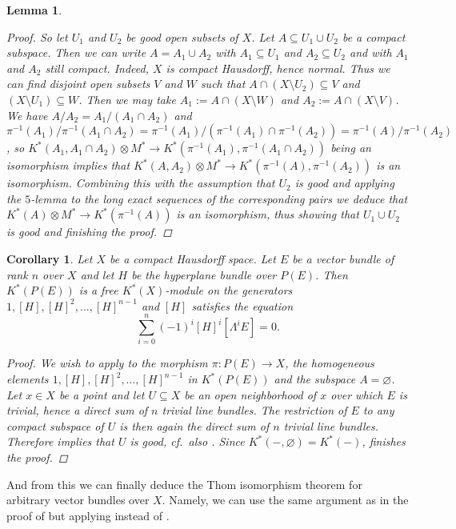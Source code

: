 \documentclass[12pt,a4paper]{amsart}
\theoremstyle{plain}
\newtheorem{lm}[thm]{Lemma}
\newtheorem{cor}[thm]{Corollary}
\theoremstyle{definition}
\theoremstyle{remark}
\begin{document}
\begin{lm}
\begin{proof}
    So let $U_{1}$ and $U_{2}$ be good open subsets of $X$.
    Let $A \subseteq U_{1} \cup U_{2}$ be a compact subspace.
    Then we can write $A = A_{1} \cup A_{2}$ with $A_{1} \subseteq U_{1}$ and $A_{2} \subseteq U_{2}$ and with $A_{1}$ and $A_{2}$ still compact.
    Indeed, $X$ is compact Hausdorff, hence normal.
    Thus we can find disjoint open subsets $V$ and $W$ such that $A \cap (X \setminus U_{2}) \subseteq V$ and $(X \setminus U_{1}) \subseteq W$.
    Then we may take $A_{1} := A \cap (X \setminus W)$ and $A_{2} := A \cap (X \setminus V)$.
    We have $A/A_{2} = A_{1}/(A_{1} \cap A_{2})$ and $\pi^{-1}(A_{1})/\pi^{-1}(A_{1} \cap A_{2}) = \pi^{-1}(A_{1})/(\pi^{-1}(A_{1}) \cap \pi^{-1}(A_{2})) = \pi^{-1}(A)/\pi^{-1}(A_{2})$, so $K^{*}(A_{1}, A_{1} \cap A_{2}) \otimes M^{*} \to K^{*}(\pi^{-1}(A_{1}), \pi^{-1}(A_{1} \cap A_{2}))$ being an isomorphism implies that $K^{*}(A, A_{2}) \otimes M^{*} \to K^{*}(\pi^{-1}(A), \pi^{-1}(A_{2}))$ is an isomorphism.
    Combining this with the assumption that $U_{2}$ is good and applying the $5$-lemma to the long exact sequences of the corresponding pairs we deduce that $K^{*}(A) \otimes M^{*} \to K^{*}(\pi^{-1}(A))$ is an isomorphism, thus showing that $U_{1} \cup U_{2}$ is good and finishing the proof.
  \end{proof}
\end{lm}

\begin{cor}\label{cor:generalgraded}
  Let $X$ be a compact Hausdorff space.
  Let $E$ be a vector bundle of rank $n$ over $X$ and let $H$ be the hyperplane bundle over $P(E)$.
  Then $K^{*}(P(E))$ is a free $K^{*}(X)$-module on the generators $1, [H], [H]^{2}, \ldots, [H]^{n-1}$ and $[H]$ satisfies the equation
  \[ \sum_{i = 0}^{n} (-1)^{i}[H]^{i} [ \Lambda^{i}E] = 0. \]
  \begin{proof}
    We wish to apply  to the morphism $\pi \colon P(E) \to X$, the homogeneous elements $1, [H], [H]^{2}, \ldots, [H]^{n-1}$ in $K^{*}(P(E))$ and the subspace $A = \varnothing$.
    Let $x \in X$ be a point and let $U \subseteq X$ be an open neighborhood of $x$ over which $E$ is trivial, hence a direct sum of $n$ trivial line bundles.
    The restriction of $E$ to any compact subspace of $U$ is then again the direct sum of $n$ trivial line bundles.
    Therefore  implies that $U$ is good, cf.~also .
    Since $K^{*}(-,\varnothing) = K^{*}(-)$,  finishes the proof.
  \end{proof}
\end{cor}

And from this we can finally deduce the Thom isomorphism theorem for arbitrary vector bundles over $X$.
Namely, we can use the same argument as in the proof of  but applying  instead of .



\vfill
\end{document}
